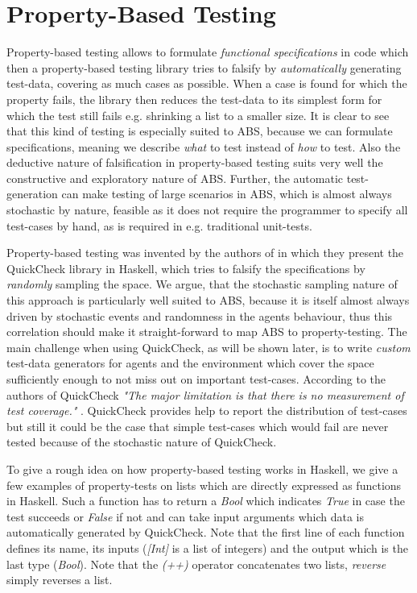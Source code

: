 \section{Property-Based Testing}
\label{sec:proptesting}

Property-based testing allows to formulate \textit{functional specifications} in code which then a property-based testing library tries to falsify by \textit{automatically} generating test-data, covering as much cases as possible. When a case is found for which the property fails, the library then reduces the test-data to its simplest form for which the test still fails e.g. shrinking a list to a smaller size. It is clear to see that this kind of testing is especially suited to ABS, because we can formulate specifications, meaning we describe \textit{what} to test instead of \textit{how} to test. Also the deductive nature of falsification in property-based testing suits very well the constructive and exploratory nature of ABS. Further, the automatic test-generation can make testing of large scenarios in ABS, which is almost always stochastic by nature, feasible as it does not require the programmer to specify all test-cases by hand, as is required in e.g. traditional unit-tests.

Property-based testing was invented by the authors of \cite{claessen_quickcheck_2000,claessen_testing_2002} in which they present the QuickCheck library in Haskell, which tries to falsify the specifications by \textit{randomly} sampling the space. We argue, that the stochastic sampling nature of this approach is particularly well suited to ABS, because it is itself almost always driven by stochastic events and randomness in the agents behaviour, thus this correlation should make it straight-forward to map ABS to property-testing. The main challenge when using QuickCheck, as will be shown later, is to write \textit{custom} test-data generators for agents and the environment which cover the space sufficiently enough to not miss out on important test-cases. According to the authors of QuickCheck \textit{"The major limitation is that there is no measurement of test coverage."} \cite{claessen_quickcheck_2000}. QuickCheck provides help to report the distribution of test-cases but still it could be the case that simple test-cases which would fail are never tested because of the stochastic nature of QuickCheck.

To give a rough idea on how property-based testing works in Haskell, we give a few examples of property-tests on lists which are directly expressed as functions in Haskell. Such a function has to return a \textit{Bool} which indicates \textit{True} in case the test succeeds or \textit{False} if not and can take input arguments which data is automatically generated by QuickCheck. Note that the first line of each function defines its name, its inputs (\textit{[Int]} is a list of integers) and the output which is the last type (\textit{Bool}). Note that the \textit{(++)} operator concatenates two lists, \textit{reverse} simply reverses a list.

